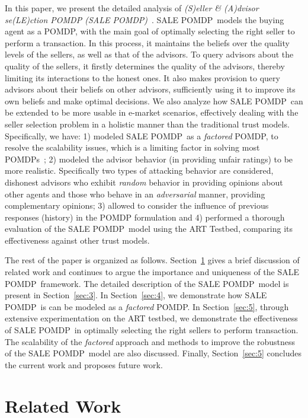 \documentclass{aamas2013}
\providecommand{\SALEP}{SALE POMDP}
\begin{document}
In this paper, we present the detailed analysis of \emph{(S)eller \& (A)dvisor se(LE)ction POMDP (\SALEP)}~\cite{oliehoekreasoning}. \SALEP\ models the buying agent as a POMDP, with the main goal of optimally selecting the right seller to perform a transaction. In this process, it maintains the beliefs over the quality levels of the sellers, as well as that of the advisors. To query advisors about the quality of the sellers, it firstly determines the quality of the advisors, thereby limiting its interactions to the honest ones. It also makes  provision to query advisors about their beliefs on other advisors, sufficiently using it to improve its own beliefs and make optimal decisions. We also analyze how \SALEP\ can be extended to be more usable in e-market scenarios, effectively dealing with the seller selection problem in a holistic manner than the traditional trust models. Specifically, we have: 1) modeled \SALEP\ as a \textit{factored} POMDP, to resolve the scalability issues, which is a limiting factor in solving most POMDPs~\cite{poupart2005exploiting}; 2) modeled the advisor behavior  (in providing unfair ratings) to be more realistic. Specifically two types of attacking behavior are considered, dishonest advisors who exhibit \textit{random} behavior in providing opinions about other agents and those who behave in an \textit{adversarial} manner, providing complementary opinions; 3) allowed to consider the influence of previous responses (history) in the POMDP formulation and 4) performed a thorough evaluation of the \SALEP\ model using the ART Testbed, comparing its effectiveness against other trust models.


The rest of the paper is organized as follows. Section~\ref{sec:2} gives a brief discussion of related work and continues to argue the importance and uniqueness of the \SALEP\ framework. The detailed description of the \SALEP\ model is present in Section~\ref{sec:3}. In Section~\ref{sec:4}, we demonstrate how \SALEP\ is can be modeled as a \textit{factored} POMDP. In Section~\ref{sec:5}, through extensive experimentation on the ART testbed, we demonstrate the effectiveness of \SALEP\ in optimally selecting the right sellers to perform transaction. The scalability of the \textit{factored} approach and methods to improve the robustness of the \SALEP\ model are also discussed. Finally, Section~\ref{sec:5} concludes the current work and proposes future work.

\section{Related Work}\label{sec:2}
\end{document}
